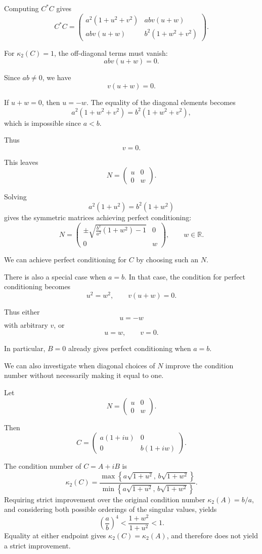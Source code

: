 \documentclass[11pt, reqno, a4paper]{amsart}
\theoremstyle{plain}
\theoremstyle{definition}
\theoremstyle{remark}
\numberwithin{equation}{section}
\begin{document}
Computing $C^*C$ gives
\[
C^*C
=
\begin{pmatrix}
a^2(1+u^2+v^2)&abv(u+w)\\
abv(u+w)&b^2(1+w^2+v^2)
\end{pmatrix}.
\]

For $\kappa_2(C)=1$, the off-diagonal terms must vanish:
\[
abv(u+w)=0.
\]

Since $ab\neq0$, we have
\[
v(u+w)=0.
\]

If $u+w=0$, then $u=-w$. The equality of the diagonal elements becomes
\[
a^2(1+w^2+v^2)
=
b^2(1+w^2+v^2),
\]
which is impossible since $a<b$.

Thus
\[
v=0.
\]

This leaves
\[
N=
\begin{pmatrix}
u&0\\
0&w
\end{pmatrix}.
\]

Solving
\[
a^2(1+u^2)=b^2(1+w^2)
\]
gives the symmetric matrices achieving perfect conditioning:
\[
\boxed{
N=
\begin{pmatrix}
\displaystyle\pm\sqrt{
\frac{b^2}{a^2}(1+w^2)-1
}&0\\
0&w
\end{pmatrix},
\qquad w\in\mathbb{R}.
}
\]

We can achieve perfect conditioning for $C$ by choosing such an $N$.

There is also a special case when $a=b$. In that case, the condition for perfect conditioning becomes
\[
u^2=w^2,
\qquad
v(u+w)=0.
\]

Thus either
\[
u=-w
\]
with arbitrary $v$, or
\[
u=w,\qquad v=0.
\]

In particular, $B=0$ already gives perfect conditioning when $a=b$.

We can also investigate when diagonal choices of $N$ improve the condition number without necessarily making it equal to one.

Let
\[
N=
\begin{pmatrix}
u&0\\
0&w
\end{pmatrix}.
\]

Then
\[
C=
\begin{pmatrix}
a(1+iu)&0\\
0&b(1+iw)
\end{pmatrix}.
\]

The condition number of \(C=A+iB\) is
\[
\kappa_2(C)
=
\frac{\max\left\{a\sqrt{1+u^2},\,b\sqrt{1+w^2}\right\}}
{\min\left\{a\sqrt{1+u^2},\,b\sqrt{1+w^2}\right\}}.
\]
Requiring strict improvement over the original condition number
\(\kappa_2(A)=b/a\), and considering both possible orderings of the
singular values, yields
\[
\boxed{
\left(\frac{a}{b}\right)^4
<
\frac{1+w^2}{1+u^2}
<1.
}
\]
Equality at either endpoint gives
\(\kappa_2(C)=\kappa_2(A)\), and therefore does not yield a strict
improvement.
\end{document}
